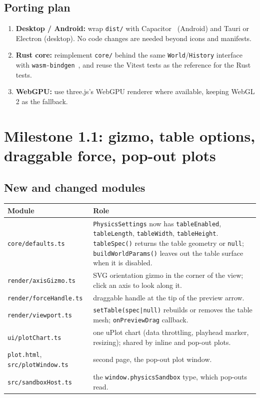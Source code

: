 \documentclass[11pt]{article}
\begin{document}
\subsection{Porting plan}
\begin{enumerate}
  \item \textbf{Desktop / Android:} wrap \texttt{dist/} with Capacitor~\cite{capacitor} (Android) and
        Tauri or Electron (desktop). No code changes are needed beyond icons and manifests.
  \item \textbf{Rust core:} reimplement \texttt{core/} behind the same \texttt{World}/\texttt{History}
        interface with \texttt{wasm-bindgen}~\cite{wasmbindgen}, and reuse the Vitest tests as the
        reference for the Rust tests.
  \item \textbf{WebGPU:} use three.js's WebGPU renderer where available, keeping WebGL\,2 as the fallback.
\end{enumerate}

\section{Milestone 1.1: gizmo, table options, draggable force, pop-out plots}

\subsection{New and changed modules}
\begin{center}
\begin{tabular}{@{}lp{}@{}}
\toprule
Module & Role \\ \midrule
\texttt{core/defaults.ts} & \texttt{PhysicsSettings} now has \texttt{tableEnabled}, \texttt{tableLength},
  \texttt{tableWidth}, \texttt{tableHeight}. \texttt{tableSpec()} returns the table geometry or
  \texttt{null}; \texttt{buildWorldParams()} leaves out the table surface when it is disabled. \\
\texttt{render/axisGizmo.ts} & SVG orientation gizmo in the corner of the view; click an axis to look along it. \\
\texttt{render/forceHandle.ts} & draggable handle at the tip of the preview arrow. \\
\texttt{render/viewport.ts} & \texttt{setTable(spec|null)} rebuilds or removes the table mesh;
  \texttt{onPreviewDrag} callback. \\
\texttt{ui/plotChart.ts} & one uPlot chart (data throttling, playhead marker, resizing); shared by
  inline and pop-out plots. \\
\texttt{plot.html}, \texttt{src/plotWindow.ts} & second page, the pop-out plot window. \\
\texttt{src/sandboxHost.ts} & the \texttt{window.physicsSandbox} type, which pop-outs read. \\ \bottomrule
\end{tabular}
\end{center}
\end{document}
